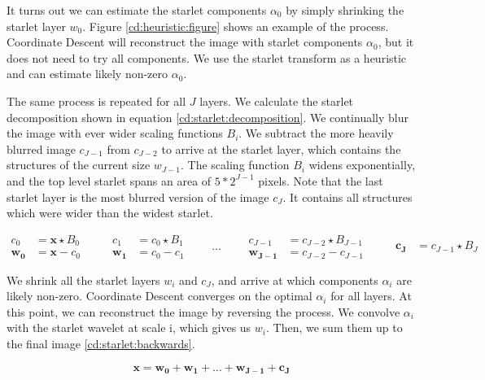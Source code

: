 It turns out we can estimate the starlet components $\alpha_0$ by simply shrinking the starlet layer $w_0$. Figure \ref{cd:heuristic:figure} shows an example of the process. Coordinate Descent will reconstruct the image with starlet components $\alpha_0$, but it does not need to try all components. We use the starlet transform as a heuristic and can estimate likely non-zero $\alpha_0$.

The same process is repeated for all $J$ layers. We calculate the starlet decomposition shown in equation \eqref{cd:starlet:decomposition}. We continually blur the image with ever wider scaling functions $B_i$. We subtract the more heavily blurred image $ c_{J-1}$ from $c_{J-2}$ to arrive at the starlet layer, which contains the structures of the current size $w_{J-1}$. The scaling function $B_i$ widens exponentially, and the top level starlet spans an area of $5*2^{J-1}$ pixels. Note that the last starlet layer is the most blurred version of the image $c_J$. It contains all structures which were wider than the widest starlet.

\begin{equation}\label{cd:starlet:decomposition}
\begin{split}
c_0 &= \bm{x} \star B_0 \\
\bm{w_0} &= \bm{x} - c_0
\end{split}
\qquad
\begin{split}
c_1 &= c_0 \star B_1 \\
\bm{w_1} &= c_0 - c_1
\end{split}
\qquad \ldots \qquad
\begin{split}
c_{J-1} &= c_{J-2} \star B_{J-1} \\
\bm{w_{J-1}} &= c_{J-2} - c_{J-1}
\end{split}
\qquad
\begin{split}
\bm{c_J} &= c_{J-1} \star B_J
\end{split}
\end{equation}

We shrink all the starlet layers $w_i$ and $c_J$, and arrive at which components $\alpha_i$ are likely non-zero. Coordinate Descent converges on the optimal $\alpha_i$ for all layers. At this point, we can reconstruct the image by reversing the process. We convolve $\alpha_i$ with the starlet wavelet at scale i, which gives us $w_i$. Then, we sum them up to the final image \eqref{cd:starlet:backwards}.

\begin{equation} \label{cd:starlet:backwards}
\bm{x} = \bm{w_0} + \bm{w_1} + \ldots + \bm{w_{J-1}} + \bm{c_J}
\end{equation}

